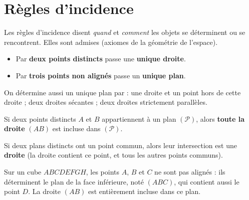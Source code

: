 \section{Règles d'incidence}

Les règles d'incidence disent \emph{quand} et \emph{comment} les objets se déterminent
ou se rencontrent. Elles sont admises (axiomes de la géométrie de l'espace).

\begin{propriete}
\begin{itemize}
  \item Par \textbf{deux points distincts} passe une \textbf{unique droite}.
  \item Par \textbf{trois points non alignés} passe un \textbf{unique plan}.
\end{itemize}
On détermine aussi un unique plan par : une droite et un point hors de cette droite ;
deux droites sécantes ; deux droites strictement parallèles.
\end{propriete}

\begin{propriete}
Si deux points distincts $A$ et $B$ appartiennent à un plan $(\mathcal{P})$, alors
\textbf{toute la droite} $(AB)$ est incluse dans $(\mathcal{P})$.
\end{propriete}

\begin{theoreme}
Si deux plans distincts ont un point commun, alors leur intersection est une
\textbf{droite} (la droite contient ce point, et tous les autres points communs).
\end{theoreme}

\begin{exemple}
Sur un cube $ABCDEFGH$, les points $A$, $B$ et $C$ ne sont pas alignés : ils
déterminent le plan de la face inférieure, noté $(ABC)$, qui contient aussi le point
$D$. La droite $(AB)$ est entièrement incluse dans ce plan.
\end{exemple}

\begin{illus}
\end{illus}


